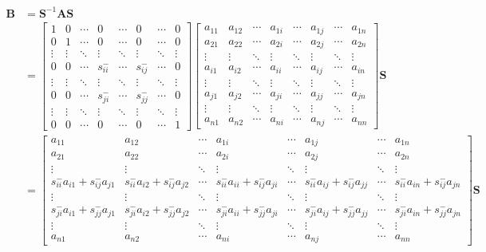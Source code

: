 \documentclass[11pt,english,a4paper]{article}
\begin{document}
\begin{flushleft}
\begin{align*}
\mathbf{B} &= \mathbf{S}^{-1} \mathbf{A}\mathbf{S} 
\\
&= \begin{bmatrix} 1 & 0 & \cdots & 0 & \cdots & 0 & \cdots & 0 \\ 0 & 1 & \cdots & 0 & \cdots & 0 & \cdots & 0 \\ \vdots & \vdots & \ddots & \vdots & \ddots & \vdots & \ddots & \vdots \\ 0 & 0 & \cdots & s_{ii}^- & \cdots & s_{ij}^- & \cdots & 0 \\ \vdots & \vdots & \ddots & \vdots & \ddots & \vdots & \ddots & \vdots \\ 0 & 0 & \cdots & s_{ji}^- & \cdots & s_{jj}^- & \cdots & 0 \\ \vdots & \vdots & \ddots & \vdots & \ddots & \vdots & \ddots & \vdots \\ 0 & 0 & \cdots & 0 & \cdots & 0 & \cdots & 1 \end{bmatrix}\begin{bmatrix} a_{11} & a_{12} & \cdots & a_{1i} & \cdots & a_{1j} & \cdots & a_{1n} \\ a_{21} & a_{22} & \cdots & a_{2i} & \cdots & a_{2j} & \cdots & a_{2n} \\ \vdots & \vdots & \ddots & \vdots & \ddots & \vdots & \ddots & \vdots \\ a_{i1} & a_{i2} & \cdots & a_{ii} & \cdots & a_{ij} & \cdots & a_{in} \\ \vdots & \vdots & \ddots & \vdots & \ddots & \vdots & \ddots & \vdots \\ a_{j1} & a_{j2} & \cdots & a_{ji} & \cdots & a_{jj} & \cdots & a_{jn} \\ \vdots & \vdots & \ddots & \vdots & \ddots & \vdots & \ddots & \vdots \\ a_{n1} & a_{n2} & \cdots & a_{ni} & \cdots & a_{nj} & \cdots &a_{nn}\end{bmatrix}\mathbf{S}
\\
&= \begin{bmatrix} a_{11} & a_{12} & \cdots & a_{1i} & \cdots & a_{1j} & \cdots & a_{1n}  \\ a_{21} & a_{22} & \cdots & a_{2i} & \cdots & a_{2j} & \cdots & a_{2n} \\ \vdots & \vdots & \ddots & \vdots & \ddots & \vdots & \ddots & \vdots \\ s_{ii}^- a_{i1} + s_{ij}^- a_{j1} & s_{ii}^- a_{i2} + s_{ij}^- a_{j2} & \cdots & s_{ii}^- a_{ii} + s_{ij}^- a_{ji} & \cdots & s_{ii}^- a_{ij} + s_{ij}^- a_{jj} & \cdots & s_{ii}^- a_{in} + s_{ij}^- a_{jn} \\ \vdots & \vdots & \ddots & \vdots & \ddots & \vdots & \ddots & \vdots \\ s_{ji}^- a_{i1} + s_{jj}^- a_{j1} & s_{ji}^- a_{i2} + s_{jj}^- a_{j2} & \cdots & s_{ji}^- a_{ii} + s_{jj}^- a_{ji} & \cdots & s_{ji}^- a_{ij} + s_{jj}^- a_{jj} & \cdots & s_{ji}^- a_{in} + s_{jj}^- a_{jn} \\ \vdots & \vdots & \ddots & \vdots & \ddots & \vdots & \ddots & \vdots \\ a_{n1} & a_{n2} & \cdots & a_{ni} & \cdots & a_{nj} & \cdots &a_{nn}\end{bmatrix} \mathbf{S}

\end{align*}
\end{flushleft}
\end{document}
